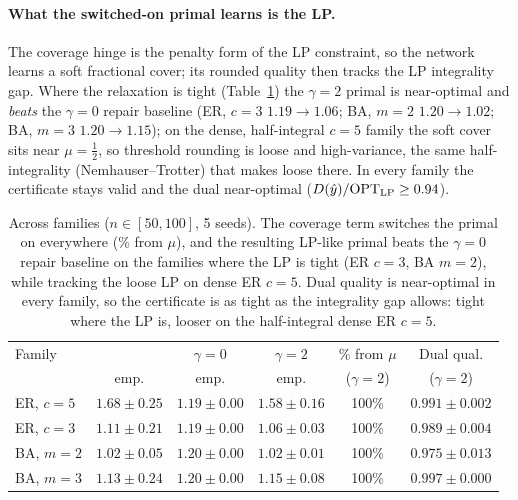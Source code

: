 \paragraph{What the switched-on primal learns is the LP.} The coverage hinge is the penalty form of the LP constraint, so the network learns a soft fractional cover; its rounded quality then tracks the LP integrality gap. Where the relaxation is tight (Table~\ref{tab:family}) the $\gamma=2$ primal is near-optimal and \emph{beats} the $\gamma=0$ repair baseline (ER, $c=3$ $1.19\!\to\!1.06$; BA, $m=2$ $1.20\!\to\!1.02$; BA, $m=3$ $1.20\!\to\!1.15$); on the dense, half-integral $c=5$ family the soft cover sits near $\mu=\tfrac12$, so threshold rounding is loose and high-variance, the same half-integrality (Nemhauser--Trotter) that makes \LPRound{} loose there. In every family the certificate stays valid and the dual near-optimal ($D(\hat y)/\mathrm{OPT}_{\mathrm{LP}}\ge 0.94$).

\begin{table}[t]\centering
\begin{tabular}{lccccc}
\toprule
Family & \LPRound{} & \PDGNN{} $\gamma{=}0$ & \PDGNN{} $\gamma{=}2$ & \% from $\mu$ & Dual qual. \\
 & emp. & emp. & emp. & ($\gamma{=}2$) & ($\gamma{=}2$) \\
\midrule
ER, $c=5$ & $1.68 \pm 0.25$ & $1.19 \pm 0.00$ & $1.58 \pm 0.16$ & 100\% & $0.991 \pm 0.002$ \\
ER, $c=3$ & $1.11 \pm 0.21$ & $1.19 \pm 0.00$ & $1.06 \pm 0.03$ & 100\% & $0.989 \pm 0.004$ \\
BA, $m=2$ & $1.02 \pm 0.05$ & $1.20 \pm 0.00$ & $1.02 \pm 0.01$ & 100\% & $0.975 \pm 0.013$ \\
BA, $m=3$ & $1.13 \pm 0.24$ & $1.20 \pm 0.00$ & $1.15 \pm 0.08$ & 100\% & $0.997 \pm 0.000$ \\
\bottomrule
\end{tabular}
\caption{Across families ($n\in[50,100]$, 5 seeds). The coverage term switches the primal on everywhere (\% from $\mu$), and the resulting LP-like primal beats the $\gamma=0$ repair baseline on the families where the LP is tight (ER $c{=}3$, BA $m{=}2$), while tracking the loose LP on dense ER $c{=}5$. Dual quality is near-optimal in every family, so the certificate is as tight as the integrality gap allows: tight where the LP is, looser on the half-integral dense ER $c{=}5$.}\label{tab:family}
\end{table}

